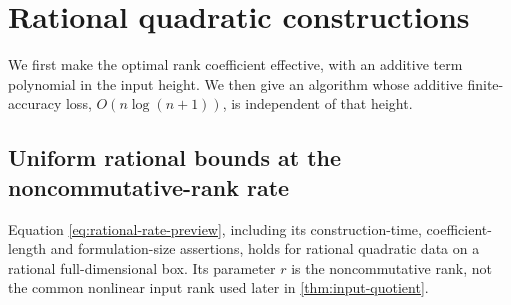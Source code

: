 \section{Rational quadratic constructions}\label{sec:rational-quadratic}

We first make the optimal rank coefficient effective, with an additive
term polynomial in the input height. We then give an algorithm whose
additive finite-accuracy loss, $O(n\log(n+1))$, is independent of that
height.

\subsection{Uniform rational bounds at the noncommutative-rank rate}

\begin{theorem}\label{thm:rational-ncrank}
Equation \eqref{eq:rational-rate-preview}, including its construction-time,
coefficient-length and formulation-size assertions, holds for rational
quadratic data on a rational full-dimensional box. Its parameter $r$
is the noncommutative rank, not the common nonlinear input rank used
later in \cref{thm:input-quotient}.
\end{theorem}

